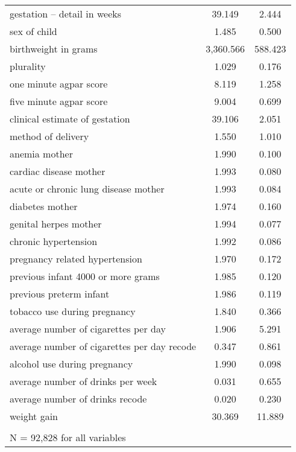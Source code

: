\begin{table}[!htbp]
\begin{tabular}{@{\extracolsep{5pt}}lcc}
gestation -- detail in weeks & 39.149 & 2.444 \\ 
sex of child & 1.485 & 0.500 \\ 
birthweight in grams & 3,360.566 & 588.423 \\ 
plurality & 1.029 & 0.176 \\ 
one minute agpar score & 8.119 & 1.258 \\ 
five minute agpar score & 9.004 & 0.699 \\ 
clinical estimate of gestation & 39.106 & 2.051 \\ 
method of delivery & 1.550 & 1.010 \\ 
anemia mother & 1.990 & 0.100 \\ 
cardiac disease mother & 1.993 & 0.080 \\ 
acute or chronic lung disease mother & 1.993 & 0.084 \\ 
diabetes mother & 1.974 & 0.160 \\ 
genital herpes mother & 1.994 & 0.077 \\ 
chronic hypertension & 1.992 & 0.086 \\ 
pregnancy related hypertension & 1.970 & 0.172 \\ 
previous infant 4000 or more grams & 1.985 & 0.120 \\ 
previous preterm infant & 1.986 & 0.119 \\ 
tobacco use during pregnancy & 1.840 & 0.366 \\ 
average number of cigarettes per day & 1.906 & 5.291 \\ 
average number of cigarettes per day recode & 0.347 & 0.861 \\ 
alcohol use during pregnancy & 1.990 & 0.098 \\ 
average number of drinks per week & 0.031 & 0.655 \\ 
average number of drinks recode & 0.020 & 0.230 \\ 
weight gain & 30.369 & 11.889 \\ 
\hline 
\hline \\[-1.8ex] 
\multicolumn{3}{l}{N = 92,828 for all variables} \\ 
\end{tabular} 
\end{table} 
